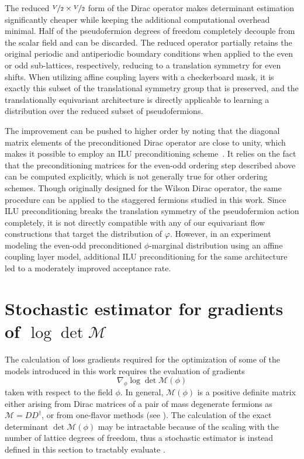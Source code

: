 \documentclass[aps,prd,twocolumn,nofootinbib,superscriptaddress,preprintnumbers]{revtex4-1}
\begin{document}
The reduced $\nicefrac{V}{2} \times \nicefrac{V}{2}$ form of the Dirac operator makes determinant estimation significantly cheaper while keeping the additional computational overhead minimal. Half of the pseudofermion degrees of freedom completely decouple from the scalar field and can be discarded. The reduced operator partially retains the original periodic and antiperiodic boundary conditions when applied to the even or odd sub-lattices, respectively, reducing to a translation symmetry for even shifts. When utilizing affine coupling layers with a checkerboard mask, it is exactly this subset of the translational symmetry group that is preserved, and the translationally equivariant architecture is directly applicable to learning a distribution over the reduced subset of pseudofermions.

The improvement can be pushed to higher order by noting that the diagonal matrix elements of the preconditioned Dirac operator are close to unity, which makes it possible to employ an ILU preconditioning scheme~\cite{deForcrand:1996ck,Peardon:2000si}. It relies on the fact that the preconditioning matrices for the even-odd ordering step described above can be computed explicitly, which is not generally true for other ordering schemes. Though originally designed for the Wilson Dirac operator, the same procedure can be applied to the staggered fermions studied in this work. Since ILU preconditioning breaks the translation symmetry of the pseudofermion action completely, it is not directly compatible with any of our equivariant flow constructions that target the distribution of $\varphi$. However, in an experiment modeling the even-odd preconditioned $\phi$-marginal distribution using an affine coupling layer model, additional ILU preconditioning for the same architecture led to a moderately improved acceptance rate.



\section{Stochastic estimator for gradients of \texorpdfstring{$\log\det{\mathcal{M}}$}{log det M}}
\label{app:varphi-estimated-grad}

The calculation of loss gradients required for the optimization of some of the models introduced in this work requires the evaluation of gradients
%
\begin{equation}\label{eq:grad-logdet-M}
    \nabla_{\phi} \log\det{\mathcal{M}(\phi)}
\end{equation}
%
taken with respect to the field $\phi$. In general, $\mathcal{M}(\phi)$ is a positive definite matrix either arising from Dirac matrices of a pair of mass degenerate fermions as $\mathcal{M} = DD^\dagger$, or from one-flavor methods (see ). The calculation of the exact determinant $\det \mathcal{M}(\phi)$ may be intractable because of the scaling with the number of lattice degrees of freedom, thus a stochastic estimator is instead defined in this section to tractably evaluate .
\end{document}

